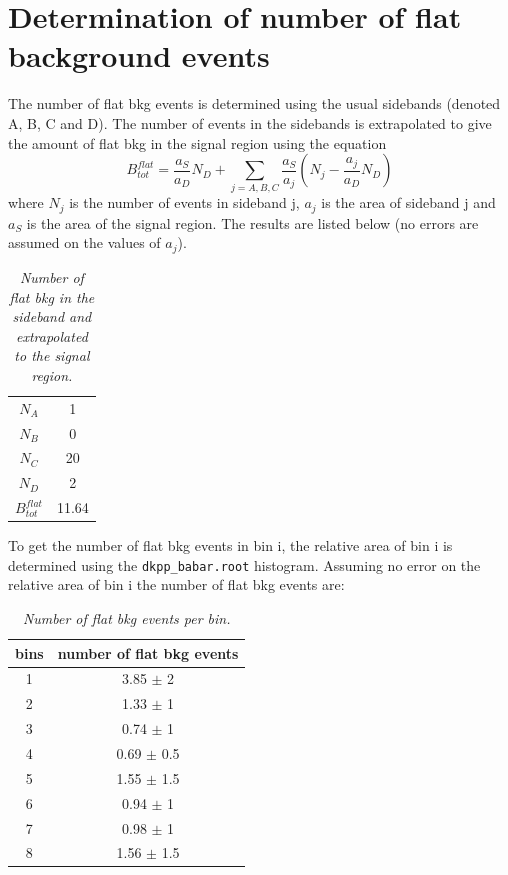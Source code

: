 \section{Determination of number of flat background events}
\label{sec:flat}
The number of flat bkg events is determined using the usual sidebands (denoted A, B, C and D). The number of events in the sidebands is extrapolated to give the amount of flat bkg in the signal region using the equation
\begin{equation}
B_{tot}^{flat} = \frac{a_S}{a_D}N_D +  \sum_{j = A,B,C} \frac{a_S}{a_j} (N_j - \frac{a_j}{a_D}N_D)
\end{equation}
where $N_j$ is the number of events in sideband j, $a_j$ is the area of sideband j and $a_S$ is the area of the signal region. The results are listed below (no errors are assumed on the values of $a_j$).  
\begin{table}[!h]
	\begin{center}
		\begin{tabular}{c| c}
     $N_A$ & 1  \\
     $N_B$ & 0 \\
     $N_C$ & 20  \\
     $N_D$ & 2 \\
     \hline
     $B_{tot}^{flat}$  & 11.64  \\
    	\end{tabular}
	    \vspace*{-0.5cm}
    \end{center}
    \caption{\textit{Number of flat bkg in the sideband and extrapolated to the signal region.}}
\end{table}
  
To get the number of flat bkg events in bin i, the relative area of bin i is determined using the \texttt{dkpp\_babar.root} histogram. Assuming no error on the relative area of bin i the number of flat bkg events are:
\clearpage
\begin{table}[!h]
	\begin{center}
		\begin{tabular}{c| c}
			bins & number of flat bkg events \\
			\hline
1 & 3.85 $\pm$ 2 \\ 
2 & 1.33 $\pm$ 1 \\ 
3 & 0.74 $\pm$ 1 \\ 
4 & 0.69 $\pm$ 0.5 \\ 
5 & 1.55 $\pm$ 1.5 \\ 
6 & 0.94 $\pm$ 1 \\ 
7 & 0.98 $\pm$ 1 \\ 
8 & 1.56 $\pm$ 1.5 \\ 
	\end{tabular}
 \vspace*{-0.5cm}
\end{center}
\caption{\textit{Number of flat bkg events per bin.}}
\end{table} 

